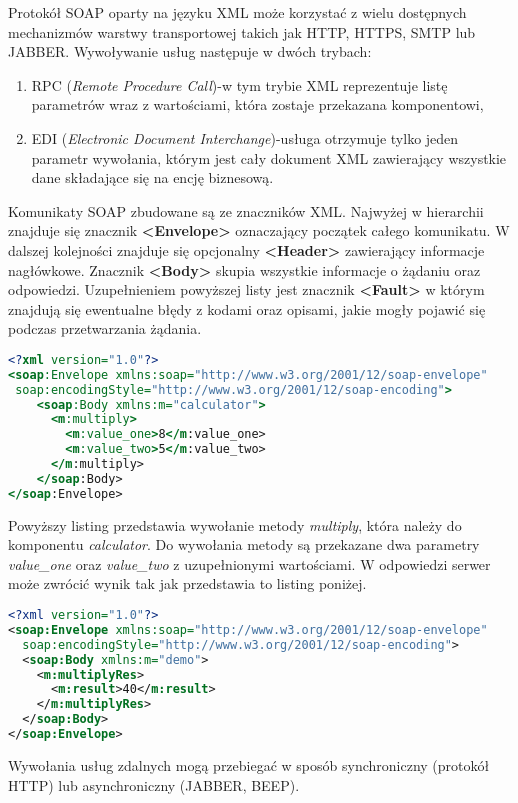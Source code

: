 Protokół SOAP oparty na języku XML może korzystać z wielu dostępnych mechanizmów warstwy transportowej takich jak HTTP, HTTPS, SMTP lub JABBER\@. Wywoływanie usług następuje w dwóch trybach:
\begin{enumerate}
	\item RPC (\textit{Remote Procedure Call})-w tym trybie XML reprezentuje listę parametrów wraz z wartościami, która zostaje przekazana komponentowi,
	\item EDI (\textit{Electronic Document Interchange})-usługa otrzymuje tylko jeden parametr wywołania, którym jest cały dokument XML zawierający wszystkie dane składające się na encję biznesową.
\end{enumerate}
\par Komunikaty SOAP zbudowane są ze znaczników XML\@. Najwyżej w hierarchii znajduje się znacznik \textbf{<Envelope>} oznaczający początek całego komunikatu. W dalszej kolejności znajduje się opcjonalny \textbf{<Header>} zawierający informacje nagłówkowe. Znacznik \textbf{<Body>} skupia wszystkie informacje o żądaniu oraz odpowiedzi. Uzupełnieniem powyższej listy jest znacznik \textbf{<Fault>} w którym znajdują się ewentualne błędy z kodami oraz opisami, jakie mogły pojawić się podczas przetwarzania żądania.
\begin{lstlisting}[language=xslt, caption=Przykład żądania SOAP]
<?xml version="1.0"?>
<soap:Envelope xmlns:soap="http://www.w3.org/2001/12/soap-envelope"
 soap:encodingStyle="http://www.w3.org/2001/12/soap-encoding">
    <soap:Body xmlns:m="calculator">
      <m:multiply>
        <m:value_one>8</m:value_one>
        <m:value_two>5</m:value_two>
      </m:multiply>  
    </soap:Body>
</soap:Envelope> 
\end{lstlisting}
Powyższy listing przedstawia wywołanie metody \textit{multiply}, która należy do komponentu \textit{calculator}. Do wywołania metody są przekazane dwa parametry \textit{value\_one} oraz \textit{value\_two} z uzupełnionymi wartościami. W odpowiedzi serwer może zwrócić wynik tak jak przedstawia to listing poniżej.
\begin{lstlisting}[language=xml, caption=Odpowiedź SOAP serwera na żadanie klienta] 
<?xml version="1.0"?>
<soap:Envelope xmlns:soap="http://www.w3.org/2001/12/soap-envelope"
  soap:encodingStyle="http://www.w3.org/2001/12/soap-encoding">
  <soap:Body xmlns:m="demo">
    <m:multiplyRes>
      <m:result>40</m:result>
    </m:multiplyRes>
  </soap:Body>
</soap:Envelope> 
\end{lstlisting}
Wywołania usług zdalnych mogą przebiegać w sposób synchroniczny (protokół HTTP) lub asynchroniczny (JABBER, BEEP).
